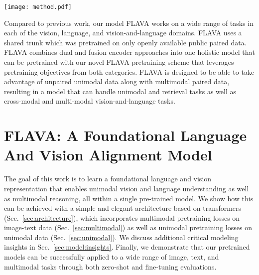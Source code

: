 \documentclass[10pt,twocolumn,letterpaper]{article}
\newcommand{\FLAVA}{FLAVA\xspace}
\begin{document}
\begin{figure*}[t]
\vspace{-1.5em}
\centering
\texttt{[image: method.pdf]}
\vspace{-.5em}
\caption{\textbf{An overview of our FLAVA model}, with an image encoder transformer to capture unimodal image representations, a text encoder transformer to process unimodal text information, and a multimodal encoder transformer that takes as input the encoded unimodal image and text and integrates their representations for multimodal reasoning. \textbf{During pretraining}, masked image modeling (MIM) and mask language modeling (MLM) losses are applied onto the image and text encoders over a single image or a text piece, respectively, while contrastive, masked multimodal modeling (MMM), and image-text matching (ITM) loss are used over paired image-text data. \textbf{For downstream tasks}, classification heads are applied on the outputs from the image, text, and multimodal encoders respectively for visual recognition, language understanding, and multimodal reasoning tasks.}
\label{fig:model}
\vspace{-1em}
\end{figure*}
Compared to previous work, our model \FLAVA works on a wide range of tasks in each of the vision, language, and vision-and-language domains. \FLAVA uses a shared trunk which was pretrained on only openly available public paired data. \FLAVA combines dual and fusion encoder approaches into one holistic model that can be pretrained with our novel \FLAVA pretraining scheme that leverages pretraining objectives from both categories. \FLAVA is designed to be able to take advantage of unpaired unimodal data along with multimodal paired data, resulting in a model that can handle unimodal and retrieval tasks as well as cross-modal and multi-modal vision-and-language tasks.

\section{FLAVA: A Foundational Language And Vision Alignment Model}

The goal of this work is to learn a foundational language and vision representation that enables unimodal vision and language understanding as well as multimodal reasoning, all within a single pre-trained model. We show how this can be achieved with a simple and elegant architecture based on transformers \cite{vaswani2017attention} (Sec.~\ref{sec:architecture}), which incorporates multimodal pretraining losses on image-text data (Sec.~\ref{sec:multimodal}) as well as unimodal pretraining losses on unimodal data (Sec.~\ref{sec:unimodal}). We discuss additional critical modeling insights in Sec.~\ref{sec:model:insights}. Finally, we demonstrate that our pretrained models can be successfully applied to a wide range of image, text, and multimodal tasks through both zero-shot and fine-tuning evaluations.
\end{document}
